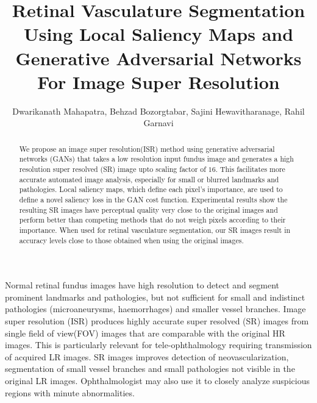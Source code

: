\documentclass{llncs}
\begin{document}
\mainmatter


\title{Retinal Vasculature Segmentation Using Local Saliency Maps and Generative Adversarial Networks For Image Super Resolution}



\author{Dwarikanath Mahapatra, Behzad Bozorgtabar, Sajini Hewavitharanage, Rahil Garnavi
}

 




\maketitle


\begin{abstract}
%
We propose an image super resolution(ISR) method using generative adversarial networks (GANs) that takes a low resolution input fundus image and generates a high resolution super resolved (SR) image upto scaling factor of $16$. This facilitates more accurate automated image analysis, especially for small or blurred landmarks and pathologies. Local saliency maps, which define each pixel's importance, are used to define a novel saliency loss in the GAN cost function. Experimental results show the resulting SR images have perceptual quality very close to the original images and perform better than competing methods that do not weigh pixels according to their importance. When used for retinal vasculature segmentation, our SR images result in accuracy levels close to those obtained when using the original images.
%
\end{abstract}

 




Normal retinal fundus images have high resolution to detect and segment prominent landmarks and pathologies, but not sufficient for small and indistinct pathologies (microaneurysms, haemorrhages) and smaller vessel branches. Image super resolution (ISR) produces highly accurate super resolved (SR) images from single field of view(FOV) images that are comparable with the original HR images.  This is particularly relevant for tele-ophthalmology requiring transmission of acquired LR images. SR images improves detection of neovascularization, segmentation of small vessel branches and small pathologies not visible in the original LR images. Ophthalmologist may also use it to closely analyze suspicious regions with minute abnormalities.
\end{document}
